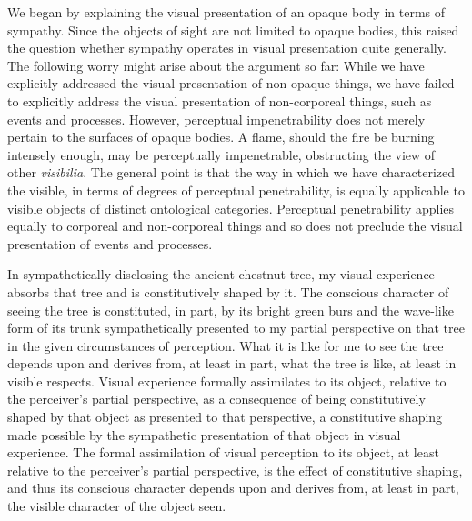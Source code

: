\documentclass[12pt]{article}
\begin{document}
We began by explaining the visual presentation of an opaque body in terms of sympathy. Since the objects of sight are not limited to opaque bodies, this raised the question whether sympathy operates in visual presentation quite generally. The following worry might arise about the argument so far: While we have explicitly addressed the visual presentation of non-opaque things, we have failed to explicitly address the visual presentation of non-corporeal things, such as events and processes. However, perceptual impenetrability does not merely pertain to the surfaces of opaque bodies. A flame, should the fire be burning intensely enough, may be perceptually impenetrable, obstructing the view of other \emph{visibilia}. The general point is that the way in which we have characterized the visible, in terms of degrees of perceptual penetrability, is equally applicable to visible objects of distinct ontological categories. Perceptual penetrability applies equally to corporeal and non-corporeal things and so does not preclude the visual presentation of events and processes.

In sympathetically disclosing the ancient chestnut tree, my visual experience absorbs that tree and is constitutively shaped by it. The conscious character of seeing the tree is constituted, in part, by its bright green burs and the wave-like form of its trunk sympathetically presented to my partial perspective on that tree in the given circumstances of perception. What it is like for me to see the tree depends upon and derives from, at least in part, what the tree is like, at least in visible respects. Visual experience formally assimilates to its object, relative to the perceiver's partial perspective, as a consequence of being constitutively shaped by that object as presented to that perspective, a constitutive shaping made possible by the sympathetic presentation of that object in visual experience. The formal assimilation of visual perception to its object, at least relative to the perceiver's partial perspective, is the effect of constitutive shaping, and thus its conscious character depends upon and derives from, at least in part, the visible character of the object seen.
\end{document}
